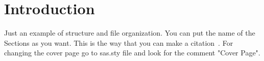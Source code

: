 \section{Introduction}
Just an example of structure and file organization. You can put the name of the Sections as you want.
This is the way that you can make a citation~\cite{ferreira2019amanda}.
For changing the cover page go to sas.sty file and look for the comment "Cover Page".